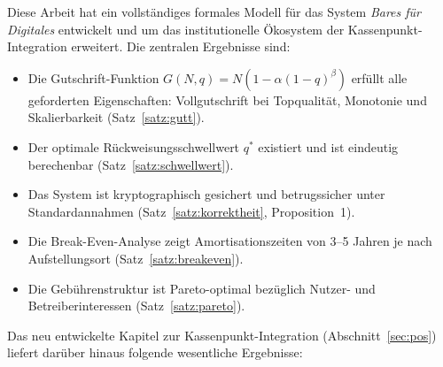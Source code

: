 ﻿\documentclass[a4paper,12pt]{article}
\theoremstyle{definition}
\begin{document}
Diese Arbeit hat ein vollständiges formales Modell für das System
\emph{Bares für Digitales} entwickelt und um das institutionelle Ökosystem
der Kassenpunkt-Integration erweitert.  Die zentralen Ergebnisse sind:

\begin{itemize}
  \item Die Gutschrift-Funktion $G(N,q) = N(1-\alpha(1-q)^{\beta})$ erfüllt
        alle geforderten Eigenschaften: Vollgutschrift bei Topqualität,
        Monotonie und Skalierbarkeit (Satz~\ref{satz:gutt}).
  \item Der optimale Rückweisungsschwellwert $q^*$ existiert und ist eindeutig
        berechenbar (Satz~\ref{satz:schwellwert}).
  \item Das System ist kryptographisch gesichert und betrugssicher unter
        Standardannahmen (Satz~\ref{satz:korrektheit}, Proposition~1).
  \item Die Break-Even-Analyse zeigt Amortisationszeiten von 3--5 Jahren
        je nach Aufstellungsort (Satz~\ref{satz:breakeven}).
  \item Die Gebührenstruktur ist Pareto-optimal bezüglich Nutzer- und
        Betreiberinteressen (Satz~\ref{satz:pareto}).
\end{itemize}

Das neu entwickelte Kapitel zur Kassenpunkt-Integration (Abschnitt~\ref{sec:pos})
liefert darüber hinaus folgende wesentliche Ergebnisse:
\end{document}
